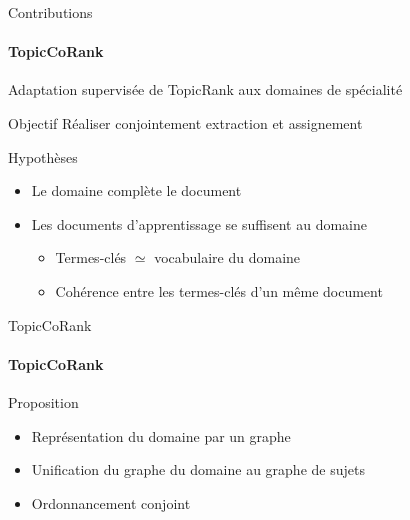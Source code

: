 \begin{frame}{Contributions}\framesubtitle{TopicCoRank}
  Adaptation supervisée de TopicRank aux domaines de spécialité

  \vspace{1em}

  \begin{block}{Objectif}
    Réaliser conjointement extraction et assignement
  \end{block}

  \vspace{1em}

  \begin{block}{Hypothèses}
    \begin{itemize}
      \item{Le domaine complète le document}
      \item{Les documents d'apprentissage se suffisent au domaine}
      \begin{itemize}
        \item{Termes-clés $\simeq$ vocabulaire du domaine}
        \item{Cohérence entre les termes-clés d'un même document}
      \end{itemize}
    \end{itemize}
  \end{block}
\end{frame}

\begin{frame}{TopicCoRank}\framesubtitle{TopicCoRank}
  \begin{block}{Proposition}
    \begin{itemize}
      \item{Représentation du domaine par un graphe}
      \item{Unification du graphe du domaine au graphe de sujets}
      \item{Ordonnancement conjoint}
    \end{itemize}
  \end{block}
\end{frame}

